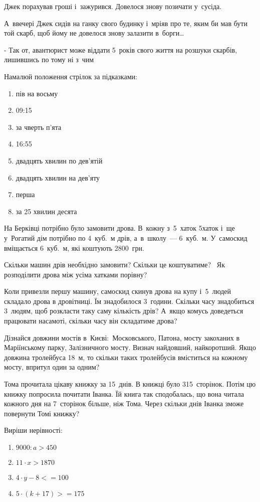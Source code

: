 Джек порахував гроші і~зажурився. Довелося знову позичати у~сусіда.

А~ввечері Джек сидів на ганку свого будинку і~мріяв про те,
яким би мав бути той скарб, щоб йому не довелося знову залазити в~борги\ldots

- Так от, авантюрист може віддати 5~років свого життя на розшуки скарбів,
лишившись по тому ні з~чим \smiley


\problem
Намалюй положення стрілок за підказками:
\begin{enumerate}
    \item пів на восьму
    \item 09:15
    \item за чверть п’ята
    \item 16:55
    \item двадцять хвилин по дев’ятій
    \item двадцять хвилин на дев’яту
    \item перша
    \item за 25 хвилин десята
\end{enumerate}


\problem
На Берківці потрібно було замовити дрова.
В~кожну з~5~хаток 5хаток і~ще у~Рогатий дім потрібно по 4~куб.~м дрів,
а~в~школу~--- 6~куб.~м.
У~самоскид вміщається 6~куб.~м, які коштують 2800~грн.

Скільки машин дрів необхідно замовити? Скільки це коштуватиме? 
Як розподілити дрова між усіма хатками порівну?

Коли привезли першу машину, самоскид скинув дрова на купу і~5~людей
складало дрова в дровітниці. Їм знадобилося 3~години.
Скільки часу знадобиться 3~людям, щоб розкласти таку саму кількість дрів?
А~якщо комусь доведеться працювати насамоті, скільки часу він складатиме дрова?


\problem
Дізнайся довжини мостів в~Києві: Московського, Патона,
мосту закоханих в Маріїнському парку, Залізничного мосту.
Визнач найдовший, найкоротший.
Якщо довжина тролейбуса 18~м, то скільки таких тролейбусів
вміститься на кожному мосту, впритул один за одним?


\problem
Тома прочитала цікаву книжку за 15~днів. В книжці було 315~сторінок.
Потім цю книжку попросила почитати Іванка. Їй книга так сподобалась,
що вона читала кожного дня на 7~сторінок більше, ніж Тома.
Через скільки днів Іванка зможе повернути Томі книжку?


\problem
Виріши нерівності:
\begin{multicols}{2}
    \begin{enumerate}
        \item $9000 : a > 450$
        \item $11 \cdot x > 1870$
        \item $4 \cdot y - 8 <= 100$
        \item $5 \cdot (k + 17) >= 175$
    \end{enumerate}
\end{multicols}


